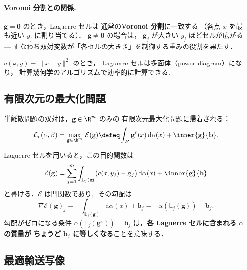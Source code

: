 \paragraph{Voronoi 分割との関係.}
$\mathbf{g} = \mathbf{0}$ のとき，Laguerre セルは
通常の\textbf{Voronoi 分割}に一致する
（各点 $x$ を最も近い $y_j$ に割り当てる）．
$\mathbf{g} \neq \mathbf{0}$ の場合は，
$\mathbf{g}_j$ が大きい $y_j$ ほどセルが広がる
--- すなわち双対変数が「各セルの大きさ」を制御する重みの役割を果たす．

$c(x, y) = \|x - y\|^2$ のとき，
Laguerre セルは多面体（power diagram）になり，
計算幾何学のアルゴリズムで効率的に計算できる．

\subsection{有限次元の最大化問題}\label{subsec:finite-dim}

半離散問題の双対は，$\mathbf{g} \in \R^m$ のみの
有限次元最大化問題に帰着される：
\begin{equation}\label{eq:semidiscrete-dual}
  \mathcal{L}_c(\alpha, \beta) = \max_{\mathbf{g} \in \R^m}\,
  \mathcal{E}(\mathbf{g})
  \defeq \int_{\mathcal{X}} \mathbf{g}^{\bar{c}}(x)\, \mathrm{d}\alpha(x)
  + \inner{\mathbf{g}}{\mathbf{b}}.
\end{equation}

Laguerre セルを用いると，この目的関数は
\begin{equation}\label{eq:energy-laguerre}
  \mathcal{E}(\mathbf{g})
  = \sum_{j=1}^m \int_{\mathbb{L}_j(\mathbf{g})}
  \bigl(c(x, y_j) - \mathbf{g}_j\bigr)\, \mathrm{d}\alpha(x)
  + \inner{\mathbf{g}}{\mathbf{b}}
\end{equation}
と書ける．$\mathcal{E}$ は凹関数であり，その勾配は
\begin{equation}\label{eq:energy-gradient}
  \nabla \mathcal{E}(\mathbf{g})_j
  = -\int_{\mathbb{L}_j(\mathbf{g})} \mathrm{d}\alpha(x) + \mathbf{b}_j
  = -\alpha(\mathbb{L}_j(\mathbf{g})) + \mathbf{b}_j.
\end{equation}
勾配がゼロになる条件 $\alpha(\mathbb{L}_j(\mathbf{g}^\star)) = \mathbf{b}_j$
は，\textbf{各 Laguerre セルに含まれる $\alpha$ の質量が
ちょうど $\mathbf{b}_j$ に等しくなる}ことを意味する．

\subsection{最適輸送写像}\label{subsec:semidiscrete-map}

